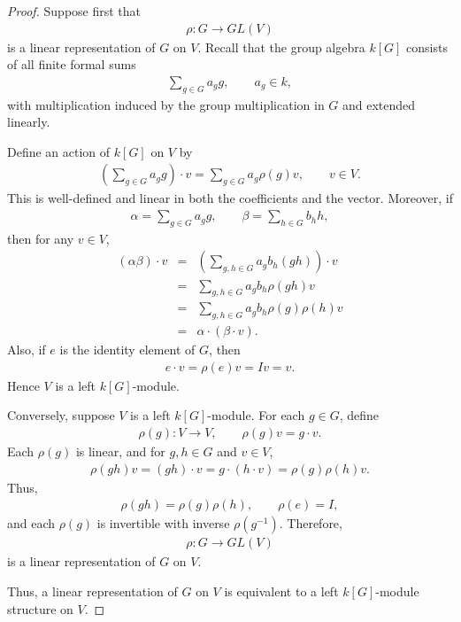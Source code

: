 \documentclass[letterpaper, 9pt, conference]{ieeeconf}
\begin{document}
\begin{proof}
Suppose first that
\begin{eqnarray}
\rho:G \to GL(V)
\end{eqnarray}
is a linear representation of $G$ on $V$. Recall that the group algebra
$k[G]$ consists of all finite formal sums
\begin{eqnarray}
\sum_{g \in G} a_g g, \qquad a_g \in k,
\end{eqnarray}
with multiplication induced by the group multiplication in $G$ and extended
linearly.

Define an action of $k[G]$ on $V$ by
\begin{eqnarray}
\left(\sum_{g \in G} a_g g\right)\cdot v
=
\sum_{g \in G} a_g \rho(g)v,
\qquad v \in V.
\end{eqnarray}
This is well-defined and linear in both the coefficients and the vector.
Moreover, if
\begin{eqnarray}
\alpha = \sum_{g \in G} a_g g, \qquad
\beta = \sum_{h \in G} b_h h,
\end{eqnarray}
then for any $v\in V$,
\begin{eqnarray*}
(\alpha\beta)\cdot v
&=&
\left(\sum_{g,h \in G} a_g b_h (gh)\right)\cdot v \\
&=&
\sum_{g,h \in G} a_g b_h \rho(gh)v \\
&=&
\sum_{g,h \in G} a_g b_h \rho(g)\rho(h)v \\
&=&
\alpha \cdot (\beta \cdot v).
\end{eqnarray*}
Also, if $e$ is the identity element of $G$, then
\begin{eqnarray*}
e \cdot v = \rho(e)v = Iv = v.
\end{eqnarray*}
Hence $V$ is a left $k[G]$-module.

Conversely, suppose $V$ is a left $k[G]$-module. For each $g \in G$, define
\begin{eqnarray}
\rho(g):V \to V, \qquad \rho(g)v = g \cdot v.
\end{eqnarray}
Each $\rho(g)$ is linear, and for $g,h \in G$ and $v \in V$,
\begin{eqnarray*}
\rho(gh)v = (gh)\cdot v = g \cdot (h \cdot v) = \rho(g)\rho(h)v.
\end{eqnarray*}
Thus,
\begin{eqnarray*}
\rho(gh)=\rho(g)\rho(h), \qquad \rho(e)=I,
\end{eqnarray*}
and each $\rho(g)$ is invertible with inverse $\rho(g^{-1})$. Therefore,
\begin{eqnarray}
\rho:G \to GL(V)
\end{eqnarray}
is a linear representation of $G$ on $V$.

Thus, a linear representation of $G$ on $V$ is equivalent to a left
$k[G]$-module structure on $V$.
\end{proof}
\end{document}
